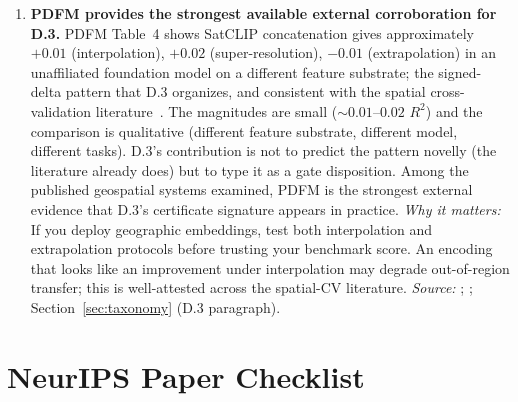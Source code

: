 \documentclass{article}
\begin{document}
\begin{enumerate}
\item \textbf{PDFM provides the strongest available external corroboration for D.3.}
PDFM Table~4 shows SatCLIP concatenation gives approximately $+0.01$ (interpolation), $+0.02$ (super-resolution), $-0.01$ (extrapolation) in an unaffiliated foundation model on a different feature substrate; the signed-delta pattern that D.3 organizes, and consistent with the spatial cross-validation literature~\citep{roberts2017cv,ploton2020spatial,mila2022nndm}. The magnitudes are small (${\sim}0.01$--$0.02$ $R^2$) and the comparison is qualitative (different feature substrate, different model, different tasks). D.3's contribution is not to predict the pattern novelly (the literature already does) but to type it as a gate disposition. Among the published geospatial systems examined, PDFM is the strongest external evidence that D.3's certificate signature appears in practice.
\emph{Why it matters:} If you deploy geographic embeddings, test both interpolation and extrapolation protocols before trusting your benchmark score. An encoding that looks like an improvement under interpolation may degrade out-of-region transfer; this is well-attested across the spatial-CV literature.
\emph{Source:} \citet[Table~4]{agarwal2025pdfm}; \citet{roberts2017cv,ploton2020spatial,mila2022nndm}; Section~\ref{sec:taxonomy} (D.3 paragraph).

\end{enumerate}

\section*{NeurIPS Paper Checklist}
\end{document}
